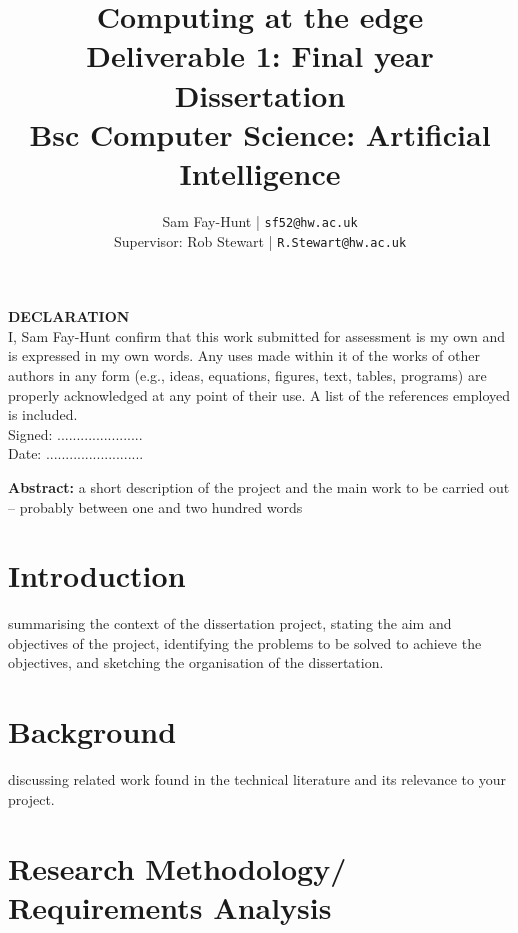 \documentclass[11pt]{article}
\begin{document}
\title{%
	\bf Computing at the edge\\ 
	\large Deliverable 1: Final year Dissertation \\
	Bsc Computer Science: Artificial Intelligence}

\author{
	Sam Fay-Hunt | \texttt{sf52@hw.ac.uk}\\
	Supervisor: Rob Stewart | \texttt{R.Stewart@hw.ac.uk}\\
}

\maketitle

\pagebreak

\textbf{DECLARATION}\\
I, Sam Fay-Hunt confirm that this work submitted for assessment is my own and is expressed in
my own words. Any uses made within it of the works of other authors in any form (e.g., ideas,
equations, figures, text, tables, programs) are properly acknowledged at any point of their
use. A list of the references employed is included.\\
Signed: ......................\\
Date: .........................\\

\pagebreak

\textbf{Abstract:} a short description of the project and the main work to be carried out – probably
between one and two hundred words
\pagebreak

\tableofcontents
\thispagestyle{empty}
\pagebreak


\setcounter{page}{1}

\section{Introduction}
summarising the context of the dissertation project, stating the aim and objectives
of the project, identifying the problems to be solved to achieve the objectives, and sketching
the organisation of the dissertation.

\section{Background}
discussing related work found in the technical literature and its relevance to your
project.

\section{Research Methodology/ Requirements Analysis}
\end{document}
